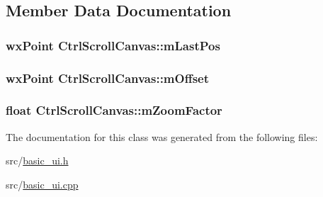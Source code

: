 \subsection{Member Data Documentation}
\hypertarget{a00096_a2deb0e6b113330f90932aad5f8ec7661}{
\subsubsection[{m\-Last\-Pos}]{\setlength{\rightskip}{0pt plus 5cm}wx\-Point Ctrl\-Scroll\-Canvas\-::m\-Last\-Pos\hspace{0.3cm}{\ttfamily [private]}}}\label{a00096_a2deb0e6b113330f90932aad5f8ec7661}
\hypertarget{a00096_aa2b08acbe872f9a9d9abf331f61876fa}{
\subsubsection[{m\-Offset}]{\setlength{\rightskip}{0pt plus 5cm}wx\-Point Ctrl\-Scroll\-Canvas\-::m\-Offset\hspace{0.3cm}{\ttfamily [private]}}}\label{a00096_aa2b08acbe872f9a9d9abf331f61876fa}
\hypertarget{a00096_a1448ec14be653fb55dc2d74725750362}{
\subsubsection[{m\-Zoom\-Factor}]{\setlength{\rightskip}{0pt plus 5cm}float Ctrl\-Scroll\-Canvas\-::m\-Zoom\-Factor\hspace{0.3cm}{\ttfamily [private]}}}\label{a00096_a1448ec14be653fb55dc2d74725750362}


The documentation for this class was generated from the following files\-:\begin{DoxyCompactItemize}
\item 
src/\hyperlink{a00177}{basic\-\_\-ui.\-h}\item 
src/\hyperlink{a00176}{basic\-\_\-ui.\-cpp}\end{DoxyCompactItemize}
